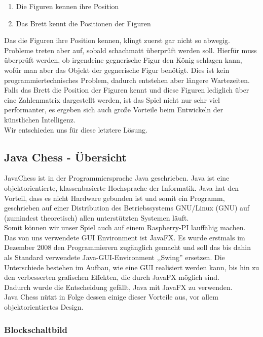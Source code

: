 \documentclass[12pt,a4paper]{article}
\begin{document}
\begin{enumerate}
	\item{Die Figuren kennen ihre Position}
	\item{Das Brett kennt die Positionen der Figuren}
\end{enumerate}
Das die Figuren ihre Position kennen, klingt zuerst gar nicht so abwegig. Probleme treten aber auf, sobald schachmatt überprüft werden soll. Hierfür muss überprüft werden, ob irgendeine gegnerische Figur den König schlagen kann, wofür man aber das Objekt der gegnerische Figur benötigt. Dies ist kein programmiertechnisches Problem, dadurch entstehen aber längere Wartezeiten. \\
Falls das Brett die Position der Figuren kennt und diese Figuren lediglich über eine Zahlenmatrix dargestellt werden, ist das Spiel nicht nur sehr viel performanter, es ergeben sich auch große Vorteile beim Entwickeln der künstlichen Intelligenz. \\ 
Wir entschieden uns für diese letztere Lösung.

\subsection{Java Chess - Übersicht}
\label{SUBSEC:JAVACHESS-OVERVIEW}

JavaChess ist in der Programmiersprache Java geschrieben. Java ist eine\\ objektorientierte, klassenbasierte Hochsprache der Informatik. Java hat den Vorteil, dass es nicht Hardware gebunden ist und somit ein Programm, geschrieben auf einer Distribution des Betriebssystems GNU/Linux (\ac{GNU}) auf (zumindest theoretisch) allen unterstützten Systemen läuft. \\
Somit können wir unser Spiel auch auf einem Raspberry-PI lauffähig machen. \\
Das von uns verwendete \ac{GUI} Environment ist JavaFX. Es wurde erstmals im Dezember 2008 den Programmierern zugänglich gemacht und soll das bis dahin als Standard verwendete Java-GUI-Environment ,,Swing'' ersetzen. Die Unterschiede bestehen im Aufbau, wie eine GUI realisiert werden kann, bis hin zu den verbesserten grafischen Effekten, die durch JavaFX möglich sind. \\[1ex]
Dadurch wurde die Entscheidung gefällt, Java mit JavaFX zu verwenden.\\
Java Chess nützt in Folge dessen einige dieser Vorteile aus, vor allem objektorientiertes Design. 

\newpage
\subsubsection{Blockschaltbild}
\label{SUBSUBSEC:BLOCKSCHALTBILD}
\end{document}
